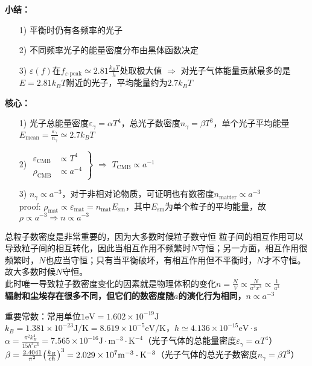 \par 
\textbf{小结：}
\begin{itemize}
	\item[1)] 平衡时仍有各频率的光子
	\item[2)] 不同频率光子的能量密度分布由黑体函数决定
	\item[3)] $\varepsilon(f)$在$f_{\text{$\varepsilon$-peak}} \simeq 2.81 \frac{k_B T}{h}$处取极大值 $\Rightarrow$ 对光子气体能量贡献最多的是$E = 2.81 k_B T$附近的光子，平均能量约为$2.7 k_B T$ 
\end{itemize}
\par 
\textbf{核心：}
\begin{itemize}
	\item[1)] 光子总能量密度$\varepsilon_{\gamma} = \alpha T^4$，总光子数密度$n_{\gamma} = \beta T^3$，单个光子平均能量$E_{\text{mean}} = \frac{\varepsilon_{\gamma}}{n_{\gamma}} \simeq 2.7 k_B T$
	\item[2)] $ \left.
	\begin{aligned}
		\varepsilon_{\text{CMB}} &\propto T^4 \\
		\rho_{\text{CMB}} &\propto a^{-4}
	\end{aligned}
	\right\}$
	$\Rightarrow$ $T_{\text{CMB}} \propto a^{-1}$
	
	\item[3)] $n_{\gamma} \propto a^{-3}$，对于非相对论物质，可证明也有数密度$n_{\text{matter}} \propto a^{-3}$ \\
	proof: $\rho_{\text{mat}} \propto \varepsilon_{\text{mat}} = n_{\text{mat}} E_{\text{sm}}$，其中$E_{\text{sm}}$为单个粒子的平均能量，故$\rho \propto a^{-3} \Rightarrow n \propto a^{-3}$
\end{itemize}

\begin{cbox}[red]
	{总粒子数密度是非常重要的，因为大多数时候粒子数守恒} 
	粒子间的相互作用可以导致粒子间的相互转化，因此当相互作用不频繁时$N$守恒；另一方面，相互作用很频繁时，$N$也应当守恒；只有当平衡破坏，有相互作用但不平衡时，$N$才不守恒。故大多数时候$N$守恒。 \\
	此时唯一导致粒子数密度变化的因素就是物理体积的变化$n = \frac{N}{V} \propto \frac{N}{a^3 x^3} \propto \frac{1}{a^3}$ \\
	\textbf{辐射和尘埃存在很多不同，但它们的数密度随$a$的演化行为相同，$n \propto a^{-3}$}
\end{cbox}

\begin{cnote}
	重要常数：常用单位$1 \mathrm{eV} = 1.602 \times 10^{-19} \mathrm{J}$ \\
	$k_B = 1.381 \times 10^{-23} \mathrm{J/K} = 8.619 \times 10^{-5} \mathrm{eV/K}$，$h \simeq 4.136 \times 10^{-15} \mathrm{eV \cdot s}$ \\
	$\alpha = \frac{\pi^2 k_B^4}{15 \hbar^3 c^3} = 7.565 \times 10^{-16} \mathrm{J \cdot m^{-3} \cdot K^{-4}}$（光子气体的总能量密度$\varepsilon_{\gamma} = \alpha T^4$） \\
	$\beta = \frac{2.4041}{\pi^2} \qty(\frac{k_B}{c \hbar})^3 = 2.029 \times 10^7 \mathrm{m^{-3} \cdot K^{-3}}$（光子气体的总光子数密度$n_{\gamma} = \beta T^3$）
\end{cnote}

